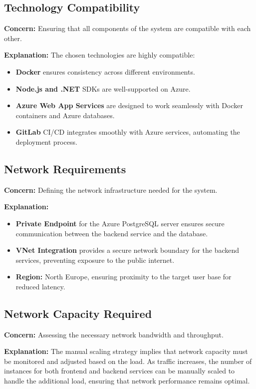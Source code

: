 \documentclass[a4paper,12pt]{article}
\begin{document}
\subsection{Technology Compatibility}
\textbf{Concern:} Ensuring that all components of the system are compatible with each other.

\textbf{Explanation:} The chosen technologies are highly compatible:
\begin{itemize}
    \item \textbf{Docker} ensures consistency across different environments.
    \item \textbf{Node.js and .NET} SDKs are well-supported on Azure.
    \item \textbf{Azure Web App Services} are designed to work seamlessly with Docker containers and Azure databases.
    \item \textbf{GitLab} CI/CD integrates smoothly with Azure services, automating the deployment process.
\end{itemize}

\subsection{Network Requirements}
\textbf{Concern:} Defining the network infrastructure needed for the system.

\textbf{Explanation:}
\begin{itemize}
    \item \textbf{Private Endpoint} for the Azure PostgreSQL server ensures secure communication between the backend service and the database.
    \item \textbf{VNet Integration} provides a secure network boundary for the backend services, preventing exposure to the public internet.
    \item \textbf{Region:} North Europe, ensuring proximity to the target user base for reduced latency.
\end{itemize}

\subsection{Network Capacity Required}
\textbf{Concern:} Assessing the necessary network bandwidth and throughput.

\textbf{Explanation:} The manual scaling strategy implies that network capacity must be monitored and adjusted based on the load. As traffic increases, the number of instances for both frontend and backend services can be manually scaled to handle the additional load, ensuring that network performance remains optimal.
\end{document}
